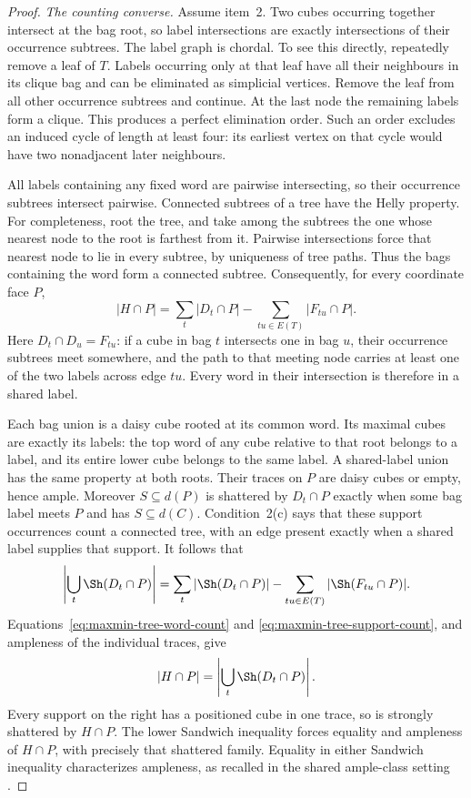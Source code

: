 \begin{proof}
\emph{The counting converse.} Assume item~2. Two cubes occurring together
intersect at the bag root, so label intersections are exactly intersections
of their occurrence subtrees. The label graph is chordal. To see this
directly, repeatedly remove a leaf of $T$. Labels occurring only at that
leaf have all their neighbours in its clique bag and can be eliminated
as simplicial vertices. Remove the leaf from all other occurrence subtrees
and continue. At the last node the remaining labels form a clique.
This produces a perfect elimination order. Such an order excludes an
induced cycle of length at least four: its earliest vertex on that cycle
would have two nonadjacent later neighbours.

All labels containing any fixed word are pairwise intersecting, so their
occurrence subtrees intersect pairwise. Connected subtrees of a tree have
the Helly property. For completeness, root the tree, and take among the
subtrees the one whose nearest node to the root is farthest from it.
Pairwise intersections force that nearest node to lie in every subtree,
by uniqueness of tree paths. Thus the bags containing the word form a
connected subtree. Consequently, for every coordinate face $P$,
\begin{equation}
 |H\cap P|=\sum_t|D_t\cap P|-\sum_{tu\in E(T)}|F_{tu}\cap P|.
 \label{eq:maxmin-tree-word-count}
\end{equation}
Here $D_t\cap D_u=F_{tu}$: if a cube in bag $t$ intersects one in bag
$u$, their occurrence subtrees meet somewhere, and the path to that
meeting node carries at least one of the two labels across edge $tu$.
Every word in their intersection is therefore in a shared label.

Each bag union is a daisy cube rooted at its common word. Its maximal
cubes are exactly its labels: the top word of any cube relative to that
root belongs to a label, and its entire lower cube belongs to the same
label. A shared-label union has the same property at both roots.
Their traces on $P$ are daisy cubes or empty, hence ample.
Moreover $S\subseteq d(P)$ is shattered by $D_t\cap P$ exactly when
some bag label meets $P$ and has $S\subseteq d(C)$.
Condition~2(c) says that these support occurrences count a connected
tree, with an edge present exactly when a shared label supplies that
support. It follows that
\begin{equation}
 \left|\bigcup_t\Sh(D_t\cap P)\right|
   =\sum_t|\Sh(D_t\cap P)|
            -\sum_{tu\in E(T)}|\Sh(F_{tu}\cap P)|.
 \label{eq:maxmin-tree-support-count}
\end{equation}
Equations~\eqref{eq:maxmin-tree-word-count} and
\eqref{eq:maxmin-tree-support-count}, and ampleness of the individual
traces, give
\[
 |H\cap P|=\left|\bigcup_t\Sh(D_t\cap P)\right|.
\]
Every support on the right has a positioned cube in one trace, so is
strongly shattered by $H\cap P$. The lower Sandwich inequality forces
equality and ampleness of $H\cap P$, with precisely that shattered family.
Equality in either Sandwich inequality characterizes ampleness, as recalled
in the shared ample-class setting \cite{Methods}.


\end{proof}
